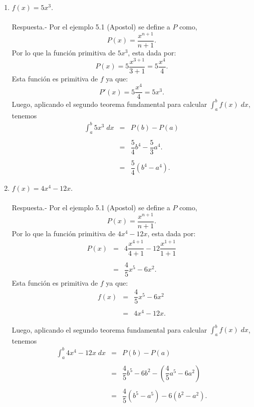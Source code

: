 \begin{enumerate}[\bfseries 1.]

    \item $f(x)=5x^3$.\\\\
	Respuesta.-\; Por el ejemplo 5.1 (Apostol) se define a $P$ como,
	$$P(x)=\dfrac{x^{n+1}}{n+1}.$$
	Por lo que la función primitiva de $5x^3$, esta dada por:
	$$P(x)=5\dfrac{x^{3+1}}{3+1}=5\dfrac{x^4}{4}.$$
	Esta función es primitiva de $f$ ya que:
	$$P'(x)=5\dfrac{x^4}{4}=5x^3.$$
	Luego, aplicando el segundo teorema fundamental para calcular $\int_a^b f(x)\; dx$, tenemos
	$$\begin{array}{rcl}
	    \displaystyle\int_a^b 5x^3\; dx &=&P(b)-P(a)\\\\
					    &=&\dfrac{5}{4}b^4-\dfrac{5}{3}a^4.\\\\
					    &=&\dfrac{5}{4}(b^4-a^4).
	\end{array}$$
	\vspace{.5cm}

    \item $f(x)=4x^4-12x$.\\\\
	Respuesta.-\; Por el ejemplo 5.1 (Apostol) se define a $P$ como,
	$$P(x)=\dfrac{x^{n+1}}{n+1}.$$
	Por lo que la función primitiva de $4x^4-12x$, esta dada por:
	$$\begin{array}{rcl}
	    P(x)&=&4\dfrac{x^{4+1}}{4+1}-12\dfrac{x^{1+1}}{1+1}\\\\
		&=&\dfrac{4}{5}x^5-6x^2.
	\end{array}$$
	Esta función es primitiva de $f$ ya que:
	$$\begin{array}{rcl}
	    f(x)&=&\dfrac{4}{5}x^5-6x^2\\\\
	    &=&4x^4-12x.
	\end{array}$$

    	Luego, aplicando el segundo teorema fundamental para calcular $\int_a^b f(x)\; dx$, tenemos
	$$\begin{array}{rcl}
	    \displaystyle\int_a^b 4x^4-12x\; dx &=&P(b)-P(a)\\\\
					    &=&\dfrac{4}{5}b^5-6b^2-\left(\dfrac{4}{5}a^5-6a^2\right)\\\\
					    &=&\dfrac{4}{5}(b^5-a^5)-6(b^2-a^2).
	\end{array}$$


\end{enumerate}
